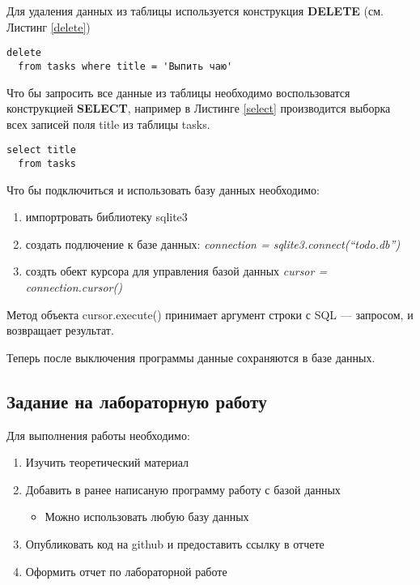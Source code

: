 \documentclass[a4paper]{article}
\begin{document}
Для удаления данных из таблицы используется конструкция \textbf{DELETE} (см. Листинг \ref{delete})

\begin{lstlisting}[label=delete,caption=Создание таблицы]
  delete
  from tasks where title = 'Выпить чаю'
\end{lstlisting}

Что бы запросить все данные из таблицы необходимо воспользоватся конструкцией \textbf{SELECT}, например в Листинге \ref{select} производится выборка всех записей поля title из таблицы tasks.

\begin{lstlisting}[label=select,caption=Выборка данных]
  select title
  from tasks
\end{lstlisting}

Что бы подключиться и использовать базу данных необходимо:
\begin{enumerate}
  \item импортровать библиотеку sqlite3
  \item создать подлючение к базе данных: \textit{connection = sqlite3.connect(``todo.db'')}
  \item создть обект курсора для управления базой данных \textit{cursor = connection.cursor()}
\end{enumerate}

Метод объекта \textsf{cursor.execute()} принимает аргумент строки с SQL --- запросом, и возвращает результат.



Теперь после выключения программы данные сохраняются в базе данных.

\newpage
\subsection{Задание на лабораторную работу}

Для выполнения работы необходимо:
\begin{enumerate}
  \item Изучить теоретический материал
  \item Добавить в ранее написаную программу работу с базой данных
    \begin{itemize}
      \item Можно использовать любую базу данных
    \end{itemize}
  \item Опубликовать код на github и предоставить ссылку в отчете
  \item Оформить отчет по лабораторной работе
\end{enumerate}
\end{document}
